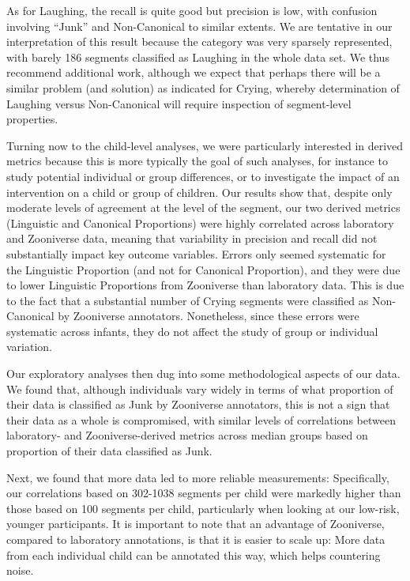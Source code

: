 \documentclass[english,,man]{apa6}
\begin{document}
As for Laughing, the recall is quite good but precision is low, with confusion involving \enquote{Junk} and Non-Canonical to similar extents. We are tentative in our interpretation of this result because the category was very sparsely represented, with barely 186 segments classified as Laughing in the whole data set. We thus recommend additional work, although we expect that perhaps there will be a similar problem (and solution) as indicated for Crying, whereby determination of Laughing versus Non-Canonical will require inspection of segment-level properties.

Turning now to the child-level analyses, we were particularly interested in derived metrics because this is more typically the goal of such analyses, for instance to study potential individual or group differences, or to investigate the impact of an intervention on a child or group of children. Our results show that, despite only moderate levels of agreement at the level of the segment, our two derived metrics (Linguistic and Canonical Proportions) were highly correlated across laboratory and Zooniverse data, meaning that variability in precision and recall did not substantially impact key outcome variables. Errors only seemed systematic for the Linguistic Proportion (and not for Canonical Proportion), and they were due to lower Linguistic Proportions from Zooniverse than laboratory data. This is due to the fact that a substantial number of Crying segments were classified as Non-Canonical by Zooniverse annotators. Nonetheless, since these errors were systematic across infants, they do not affect the study of group or individual variation.

Our exploratory analyses then dug into some methodological aspects of our data. We found that, although individuals vary widely in terms of what proportion of their data is classified as Junk by Zooniverse annotators, this is not a sign that their data as a whole is compromised, with similar levels of correlations between laboratory- and Zooniverse-derived metrics across median groups based on proportion of their data classified as Junk.

Next, we found that more data led to more reliable measurements: Specifically, our correlations based on 302-1038 segments per child were markedly higher than those based on 100 segments per child, particularly when looking at our low-risk, younger participants. It is important to note that an advantage of Zooniverse, compared to laboratory annotations, is that it is easier to scale up: More data from each individual child can be annotated this way, which helps countering noise.
\end{document}
